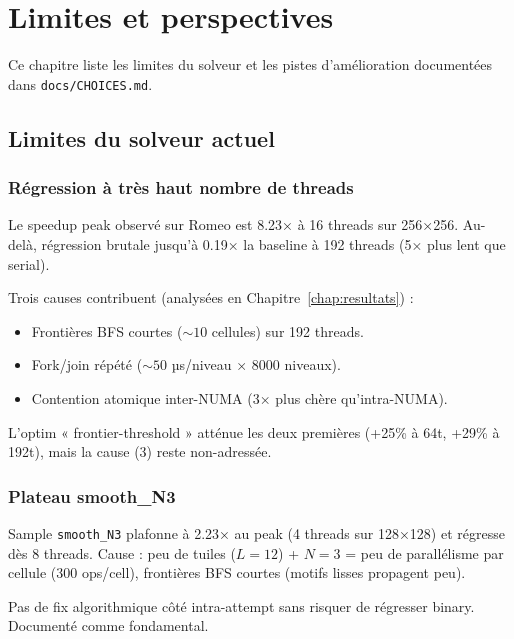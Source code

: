 \chapter{Limites et perspectives}
\label{chap:limites}

Ce chapitre liste les limites du solveur et les pistes d'amélioration documentées dans \texttt{docs/CHOICES.md}.

\section{Limites du solveur actuel}
\label{sec:limites:current}

\subsection{Régression à très haut nombre de threads}

Le speedup peak observé sur Romeo est 8.23× à 16 threads sur 256×256. Au-delà, régression brutale jusqu'à 0.19× la baseline à 192 threads (5× plus lent que serial).

Trois causes contribuent (analysées en Chapitre~\ref{chap:resultats}) :
\begin{itemize}
    \item Frontières BFS courtes ($\sim 10$ cellules) sur 192 threads.
    \item Fork/join répété ($\sim 50$ µs/niveau × 8000 niveaux).
    \item Contention atomique inter-NUMA (3× plus chère qu'intra-NUMA).
\end{itemize}

L'optim « frontier-threshold » atténue les deux premières (+25\% à 64t, +29\% à 192t), mais la cause (3) reste non-adressée.

\subsection{Plateau smooth\_N3}

Sample \texttt{smooth\_N3} plafonne à 2.23× au peak (4 threads sur 128×128) et régresse dès 8 threads. Cause : peu de tuiles ($L = 12$) + $N = 3$ = peu de parallélisme par cellule (300 ops/cell), frontières BFS courtes (motifs lisses propagent peu).

Pas de fix algorithmique côté intra-attempt sans risquer de régresser binary. Documenté comme fondamental.

